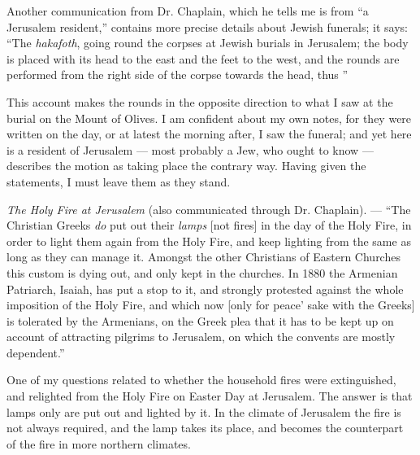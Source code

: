 \documentclass[a4paper, 11pt, oneside, polutonikogreek, english]{article}
\newcommand*\svgAAA{}
\begin{document}
Another communication from Dr. Chaplain, which he tells me is from ``a Jerusalem resident,'' contains more precise details about Jewish funerals; it says: ``The \emph{hakafoth}, going round the corpses at Jewish burials in Jerusalem; the body is placed with its head to the east and the feet to the west, and the rounds are performed from the right side of the corpse towards the head, thus $\svgAAA$''

This account makes the rounds in the opposite direction to what I saw at the burial on the Mount of Olives. I am confident about my own notes, for they were written on the day, or at latest the morning after, I saw the funeral; and yet here is a resident of Jerusalem --- most probably a Jew, who ought to know --- describes the motion as taking place the contrary way. Having given the statements, I must leave them as they stand.

\emph{The Holy Fire at Jerusalem} (also communicated through Dr. Chaplain). --- ``The Christian Greeks \emph{do} put out their \emph{lamps} [not fires] in the day of the Holy Fire, in order to light them again from the Holy Fire, and keep lighting from the same as long as they can manage it. Amongst the other Christians of Eastern Churches this custom is dying out, and only kept in the churches. In 1880 the Armenian Patriarch, Isaiah, has put a stop to it, and strongly protested against the whole imposition of the Holy Fire, and which now [only for peace' sake with the Greeks] is tolerated by the Armenians, on the Greek plea that it has to be kept up on account of attracting pilgrims to Jerusalem, on which the convents are mostly dependent.''

One of my questions related to whether the household fires were extinguished, and relighted from the Holy Fire on Easter Day at Jerusalem. The answer is that lamps only are put out and lighted by it. In the climate of Jerusalem the fire is not always required, and the lamp takes its place, and becomes the counterpart of the fire in more northern climates.
\end{document}
